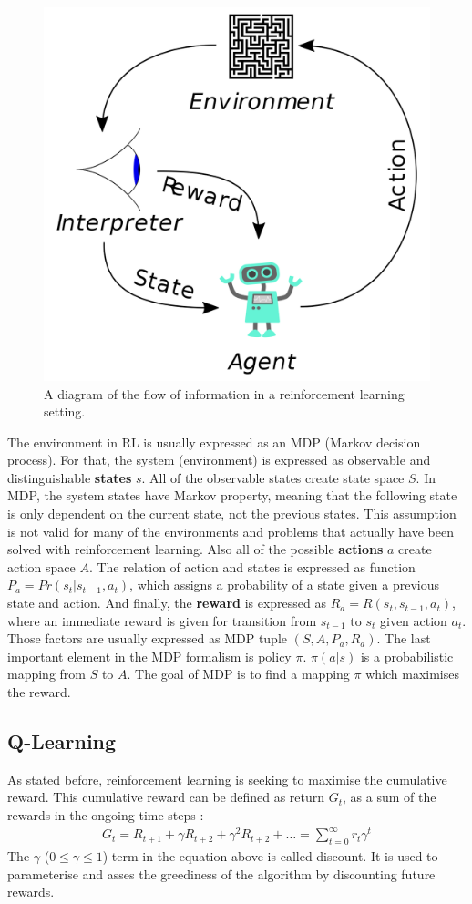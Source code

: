 \begin{figure}
  \centering
  \includegraphics[width=0.4\linewidth]{figures/chapter3/Reinforcement_learning_diagram.svg.png}
  \caption[rlenv]{A diagram of the flow of information in a reinforcement learning setting\footnotemark.}
  \label{fig:rl_env_flow}
\end{figure}

The environment in RL is usually expressed as an MDP (Markov decision process).
For that, the system (environment) is expressed as observable and distinguishable \textbf{states} $s$.
All of the observable states create state space $S$.
In MDP, the system states have Markov property, meaning that the following state is only dependent on the current state, not the previous states.
This assumption is not valid for many of the environments and problems that actually have been solved with reinforcement learning.
Also all of the possible \textbf{actions}  $a$ create action space $A$.
The relation of action and states is expressed as function $P_{a}=Pr(s_{t} | s_{t-1}, a_{t})$, which assigns a probability of a state given a previous state and action.
And finally, the \textbf{reward} is expressed as $R_{a}=R(s_{t}, s_{t-1}, a_{t})$, where an immediate reward is given for transition from $s_{t-1}$ to $s_{t}$ given action $a_{t}$.
Those factors are usually expressed as MDP tuple $(S, A, P_{a}, R_{a})$.
The last important element in the MDP formalism is policy $\pi$.
$\pi(a|s)$ is a probabilistic mapping from $S$ to $A$. The goal of MDP is to find a mapping $\pi$ which maximises the reward.

\subsection{Q-Learning}

As stated before, reinforcement learning is seeking to maximise the cumulative reward.
This cumulative reward can be defined as return $G_{t}$, as a sum of the rewards in the ongoing time-steps \cite{Sutton1998}:
\begin{align}
  G_{t} = R_{t+1} +  \gamma R_{t+2} + \gamma^{2} R_{t+2} + \ldots =   \sum_{t=0}^{\infty} r_{t}\gamma^{t}
\end{align}
The $\gamma$ ($0 \leq \gamma \leq 1$) term in the equation above is called discount.
It is used to parameterise and asses the greediness of the algorithm by discounting future rewards.

